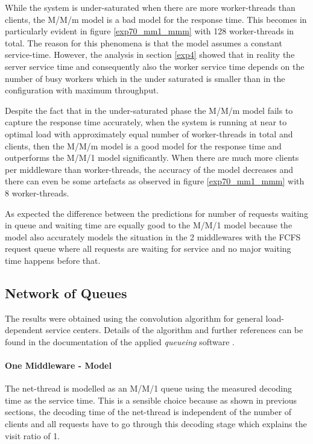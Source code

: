 \documentclass[report.tex]{subfiles}
\begin{document}
While the system is under-saturated when there are more worker-threads than clients, the M/M/m model is a bad model for the response time. This becomes in particularly evident in figure \ref{exp70_mm1_mmm} with 128 worker-threads in total. The reason for this phenomena is that the model assumes a constant service-time. However, the analysis in section \ref{exp4} showed that in reality the server service time and consequently also the worker service time depends on the number of busy workers which in the under saturated is smaller than in the configuration with maximum throughput.

Despite the fact that in the under-saturated phase the M/M/m model fails to capture the response time accurately, when the system is running at near to optimal load with approximately equal number of worker-threads in total and clients, then the M/M/m model is a good model for the response time and outperforms the M/M/1 model significantly.
When there are much more clients per middleware than worker-threads, the accuracy of the model decreases and there can even be some artefacts as observed in figure \ref{exp70_mm1_mmm} with 8 worker-threads.

As expected the difference between the predictions for number of requests waiting in queue and waiting time are equally good to the M/M/1 model because the model also accurately models the situation in the 2 middlewares with the FCFS request queue where all requests are waiting for service and no major waiting time happens before that.

\subsection{Network of Queues}

The results were obtained using the convolution algorithm for general load-dependent service centers. Details of the algorithm and further references can be found in the documentation of the applied \emph{queueing} software \cite{queueing}.


\paragraph{One Middleware - Model}

The net-thread is modelled as an M/M/1 queue using the measured decoding time as the service time.
This is a sensible choice because as shown in previous sections, the decoding time of the net-thread is independent of the number of clients and all requests have to go through this decoding stage which explains the visit ratio of 1.
\end{document}
